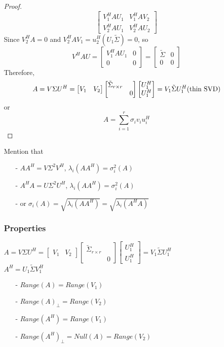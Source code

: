 \begin{multicols}{2}
\begin{proof}
\[\begin{bmatrix}
            V_1^HAU_1 & V_1^HAV_2 \\ V_2^HAU_1 & V_2^HAU_2
        \end{bmatrix}
    \]
    Since $V_2^HA = 0$ and $V_2^HAV_1=u_2^H(U_1\tilde{\Sigma})=0$, so
    \[
        V^HAU = \begin{bmatrix}
            V_1^HAU_1 & 0 \\ 0 & 0
        \end{bmatrix} = \begin{bmatrix}
            \tilde{\Sigma} & 0 \\ 0 & 0
        \end{bmatrix}
    \]
    Therefore, 
    \[
        A = V\Sigma U^H = \begin{bmatrix}
            V_1 & V_2
        \end{bmatrix} \begin{bmatrix}
            \tilde{\Sigma}_{r\times r} & \\ & 0
        \end{bmatrix}\begin{bmatrix}
            U_1^H \\ U_1^H
        \end{bmatrix}
        = V_1\tilde{\Sigma}U_1^H (\text{\rm thin SVD})
    \]
    or
    \[
        A = \sum_{i=1}^r \sigma_iv_iu_i^H
    \]
\end{proof}
Mention that
\begin{itemize}
    \item [-] $AA^H = V\Sigma^2V^H$, $\lambda_i(AA^H)=\sigma_i^2(A)$
    \item [-] $A^HA = U\Sigma^2U^H$, $\lambda_i(AA^H)=\sigma_i^2(A)$
    \item [-] or $\sigma_i(A) = \sqrt{\lambda_i(AA^H)}= \sqrt{\lambda_i(A^HA)}$
\end{itemize}

\subsubsection{Properties}
$
A = V\Sigma U^H = \begin{bmatrix}
    V_1 & V_2
\end{bmatrix} \begin{bmatrix}
    \tilde{\Sigma}_{r\times r} & \\ & 0
\end{bmatrix}\begin{bmatrix}
    U_1^H \\ U_1^H
\end{bmatrix}
= V_1\tilde{\Sigma}U_1^H
$\\
$
A^H = U_1\tilde{\Sigma}V_1^H
$
\begin{itemize}
    \item [-] $Range(A) = Range(V_1)$
    \item [-] $Range(A)_{\bot} = Range(V_2)$
    \item [-] $Range(A^H) = Range(V_1)$
    \item [-] $Range(A^H)_{\bot} = Null(A) = Range(V_2)$
\end{itemize}


\end{multicols}
